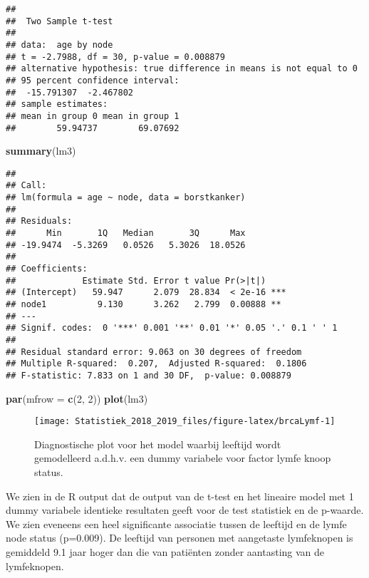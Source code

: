 \documentclass[12pt,dutch,coursenotes]{book}
\newenvironment{Shaded}{\begin{snugshade}}{\end{snugshade}}
\newcommand{\KeywordTok}[1]{\textcolor[rgb]{0.13,0.29,0.53}{\textbf{#1}}}
\newcommand{\DataTypeTok}[1]{\textcolor[rgb]{0.13,0.29,0.53}{#1}}
\newcommand{\DecValTok}[1]{\textcolor[rgb]{0.00,0.00,0.81}{#1}}
\newcommand{\NormalTok}[1]{#1}
\theoremstyle{definition}
\theoremstyle{definition}
\theoremstyle{definition}
\theoremstyle{remark}
\begin{document}
\begin{verbatim}
## 
##  Two Sample t-test
## 
## data:  age by node
## t = -2.7988, df = 30, p-value = 0.008879
## alternative hypothesis: true difference in means is not equal to 0
## 95 percent confidence interval:
##  -15.791307  -2.467802
## sample estimates:
## mean in group 0 mean in group 1 
##        59.94737        69.07692
\end{verbatim}

\begin{Shaded}
\begin{Highlighting}[]
\KeywordTok{summary}\NormalTok{(lm3)}
\end{Highlighting}
\end{Shaded}

\begin{verbatim}
## 
## Call:
## lm(formula = age ~ node, data = borstkanker)
## 
## Residuals:
##      Min       1Q   Median       3Q      Max 
## -19.9474  -5.3269   0.0526   5.3026  18.0526 
## 
## Coefficients:
##             Estimate Std. Error t value Pr(>|t|)    
## (Intercept)   59.947      2.079  28.834  < 2e-16 ***
## node1          9.130      3.262   2.799  0.00888 ** 
## ---
## Signif. codes:  0 '***' 0.001 '**' 0.01 '*' 0.05 '.' 0.1 ' ' 1
## 
## Residual standard error: 9.063 on 30 degrees of freedom
## Multiple R-squared:  0.207,  Adjusted R-squared:  0.1806 
## F-statistic: 7.833 on 1 and 30 DF,  p-value: 0.008879
\end{verbatim}

\begin{Shaded}
\begin{Highlighting}[]
\KeywordTok{par}\NormalTok{(}\DataTypeTok{mfrow =} \KeywordTok{c}\NormalTok{(}\DecValTok{2}\NormalTok{, }\DecValTok{2}\NormalTok{))}
\KeywordTok{plot}\NormalTok{(lm3)}
\end{Highlighting}
\end{Shaded}

\begin{figure}

{\centering \texttt{[image: Statistiek\_2018\_2019\_files/figure-latex/brcaLymf-1]} 

}

\caption{Diagnostische plot voor het model waarbij leeftijd wordt gemodelleerd a.d.h.v. een dummy variabele voor factor lymfe knoop status.}\label{fig:brcaLymf}
\end{figure}

We zien in de R output dat de output van de t-test en het lineaire model
met 1 dummy variabele identieke resultaten geeft voor de test statistiek
en de p-waarde. We zien eveneens een heel significante associatie tussen
de leeftijd en de lymfe node status (p=0.009). De leeftijd van personen
met aangetaste lymfeknopen is gemiddeld 9.1 jaar hoger dan die van
patiënten zonder aantasting van de lymfeknopen.
\end{document}

